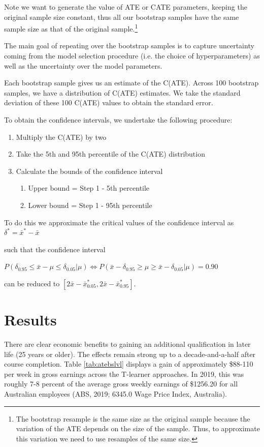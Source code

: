 \documentclass[12pt, a4paper]{article}
\begin{document}
Note we want to generate the value of ATE or CATE parameters, keeping the original sample size constant, thus all our bootstrap samples have the same sample size as that of the original sample.\footnote{The bootstrap resample is the same size as the original sample because the variation of the ATE depends on the size of the sample. Thus, to approximate this variation we need to use resamples of the same size.}

The main goal of repeating over the bootstrap samples is to capture uncertainty coming from the model selection procedure (i.e. the choice of hyperparameters) as well as the uncertainty over the model parameters.

Each bootstrap sample gives us an estimate of the C(ATE). Across 100 bootstrap samples, we have a distribution of C(ATE) estimates. We take the standard deviation of these 100 C(ATE) values to obtain the standard error. 

To obtain the confidence intervals, we undertake the following procedure:
\begin{enumerate}
\item Multiply the C(ATE) by two 
\item Take the 5th and 95th percentile of the C(ATE) distribution 
\item Calculate the bounds of the confidence interval 
	\begin{enumerate}
	\item Upper bound = Step 1 - 5th percentile 
	\item Lower bound = Step 1 - 95th percentile
	\end{enumerate}
\end{enumerate}

To do this we approximate the critical values of the confidence interval as $\delta^* = \bar{x}^* - \bar{x}$ 

such that the confidence interval 

$P(\delta_{0.95} \leq \bar{x} - \mu \leq \delta_{0.05} | \mu) \Leftrightarrow P(\bar{x} - \delta_{0.95} \geq \mu \geq \bar{x} - \delta_{0.05} | \mu) = 0.90$ 

can be reduced to $[2\bar{x} -\bar{x}^*_{0.05} , 2\bar{x} -\bar{x}^*_{0.95}]$.

\section{Results}

There are clear economic benefits to gaining an additional qualification in later life (25 years or older). The effects remain strong up to a decade-and-a-half after course completion. Table \ref{tab:atebslvl} displays a gain of approximately \$88-110 per week in gross earnings across the T-learner approaches. In 2019, this was roughly 7-8 percent of the average gross weekly earnings of \$1256.20 for all Australian employees (ABS, 2019; 6345.0 Wage Price Index, Australia). 
\end{document}

